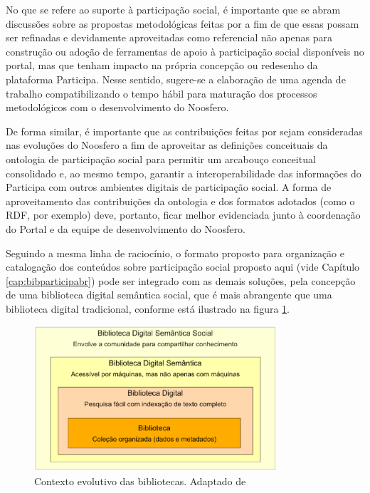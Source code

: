 No que se refere ao suporte à participação social, é importante que se abram discussões sobre as propostas metodológicas feitas por \cite{solagna2014metodologias} a fim de que essas possam ser refinadas e devidamente aproveitadas como referencial não apenas para construção ou adoção de ferramentas de apoio à participação social disponíveis no portal, mas que tenham impacto na própria concepção ou redesenho da plataforma Participa. Nesse sentido, sugere-se a elaboração de uma agenda de trabalho compatibilizando o tempo hábil para maturação dos processos metodológicos com o desenvolvimento do Noosfero.

De forma similar, é importante que as contribuições feitas por \cite{fabbri2014ontologias} sejam consideradas nas evoluções do Noosfero a fim de aproveitar as definições conceituais da ontologia de participação social para permitir um arcabouço conceitual consolidado e, ao mesmo tempo, garantir a interoperabilidade das informações do Participa com outros ambientes digitais de participação social. A forma de aproveitamento das contribuições da ontologia e dos formatos adotados (como o RDF, por exemplo) deve, portanto, ficar melhor evidenciada junto à coordenação do Portal e da equipe de desenvolvimento do Noosfero.

Seguindo a mesma linha de raciocínio, o formato proposto para organização e catalogação dos conteúdos sobre participação social proposto aqui (vide Capítulo \ref{cap:bibparticipabr}) pode ser integrado com as demais soluções, pela concepção de uma biblioteca digital semântica social, que é mais abrangente que uma biblioteca digital tradicional, conforme está ilustrado na figura \ref{fig:contextoevolutivo}.

\graphicspath{{figuras/}}
\begin{figure}[H]
\centering
\includegraphics[width=0.8\textwidth]{contexto_evolutivo}
\caption[Contexto evolutivo das bibliotecas]{Contexto evolutivo das bibliotecas. Adaptado de \cite{kruk2006libraries}}
\label{fig:contextoevolutivo}
\end{figure}

